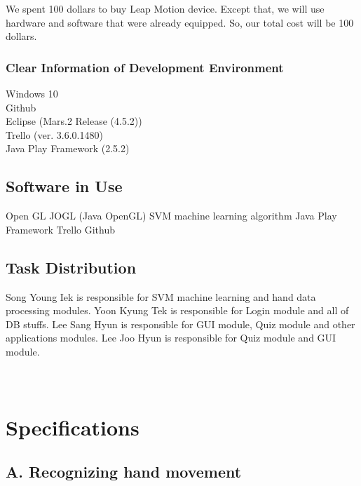 \documentclass[10pt,journal,compsoc]{IEEEtran}
\begin{document}
We spent 100 dollars to buy Leap Motion device. Except that, we will use hardware and software that were already equipped. So, our total cost will be 100 dollars.

\subsubsection{Clear Information of Development Environment}

Windows 10
\\Github
\\Eclipse (Mars.2 Release (4.5.2))
\\Trello (ver. 3.6.0.1480)
\\Java Play Framework (2.5.2)

\subsection{Software in Use}
Open GL
JOGL (Java OpenGL)
SVM machine learning algorithm
Java Play Framework
Trello
Github


\subsection{Task Distribution}
Song Young Iek is responsible for SVM machine learning and hand data processing modules.
Yoon Kyung Tek is responsible for Login module and all of DB stuffs.
Lee Sang Hyun is responsible for GUI module, Quiz module and other applications modules.
Lee Joo Hyun is responsible for Quiz module and GUI module.\\\\\\

\ifCLASSOPTIONcompsoc
{}
\else
\section{Specifications}
\label{sec:Specifications}
\fi
\subsection{A. Recognizing hand movement}
\end{document}

